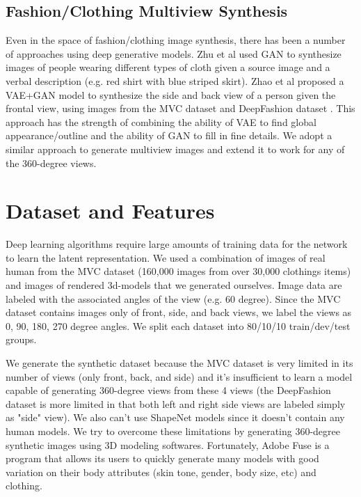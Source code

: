 \documentclass[10pt,conference]{IEEEtran}
\begin{document}
\subsection{Fashion/Clothing Multiview Synthesis}

Even in the space of fashion/clothing image synthesis, there has been a number of approaches using deep generative models. Zhu et al \autocite{zhu2017your} used GAN to synthesize images of people wearing different types of cloth given a source image and a verbal description (e.g. red shirt with blue striped skirt). Zhao et al \autocite{zhao2017multi} proposed a VAE+GAN model to synthesize the side and back view of a person given the frontal view, using images from the MVC dataset \autocite{liu2016mvc} and DeepFashion dataset \autocite{liu2016deepfashion}. This approach has the strength of combining the ability of VAE to find global appearance/outline and the ability of GAN to fill in fine details. We adopt a similar approach to generate multiview images and extend it to work for any of the 360-degree views.



\section{Dataset and Features}

Deep learning algorithms require large amounts of training data for the network to learn the latent representation. We used a combination of images of real human from the MVC \autocite{liu2016mvc} dataset (160,000 images from over 30,000 clothings items) and images of rendered 3d-models that we generated ourselves. Image data are labeled with the associated angles of the view (e.g. 60 degree). Since the MVC dataset contains images only of front, side, and back views, we label the views as 0, 90, 180, 270 degree angles. We split each dataset into 80/10/10 train/dev/test groups.

We generate the synthetic dataset because the MVC dataset is very limited in its number of views (only front, back, and side) and it's insufficient to learn a model capable of generating 360-degree views from these 4 views (the DeepFashion dataset \autocite{liu2016deepfashion} is more limited in that both left and right side views are labeled simply as "side" view). We also can't use ShapeNet \autocite{chang2015shapenet} models since it doesn't contain any human models. We try to overcome these limitations by generating 360-degree synthetic images using 3D modeling softwares. Fortunately, Adobe Fuse is a program that allows its users to quickly generate many models with good variation on their body attributes (skin tone, gender, body size, etc) and clothing.
\end{document}
